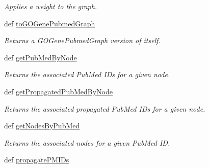 \begin{DoxyCompactItemize}
\begin{DoxyCompactList}\small\item\em Applies a weight to the graph. \end{DoxyCompactList}\item 
def \hyperlink{classgographer_1_1_g_o_pubmed_graph_1_1_g_o_pubmed_graph_a1c154dbc02edbf83254ee5cb5b20fb44}{to\-G\-O\-Gene\-Pubmed\-Graph}
\begin{DoxyCompactList}\small\item\em Returns a G\-O\-Gene\-Pubmed\-Graph version of itself. \end{DoxyCompactList}\item 
def \hyperlink{classgographer_1_1_g_o_pubmed_graph_1_1_g_o_pubmed_graph_a29482c641bfcdf4c98a6d9040f4f5f48}{get\-Pub\-Med\-By\-Node}
\begin{DoxyCompactList}\small\item\em Returns the associated Pub\-Med I\-Ds for a given node. \end{DoxyCompactList}\item 
def \hyperlink{classgographer_1_1_g_o_pubmed_graph_1_1_g_o_pubmed_graph_a983edce6ae320ee5cf42a6a7dee4695f}{get\-Propagated\-Pub\-Med\-By\-Node}
\begin{DoxyCompactList}\small\item\em Returns the associated propagated Pub\-Med I\-Ds for a given node. \end{DoxyCompactList}\item 
def \hyperlink{classgographer_1_1_g_o_pubmed_graph_1_1_g_o_pubmed_graph_a13c9486adf5d33fb73d52f4ed6eb847d}{get\-Nodes\-By\-Pub\-Med}
\begin{DoxyCompactList}\small\item\em Returns the associated nodes for a given Pub\-Med I\-D. \end{DoxyCompactList}\item 
\hypertarget{classgographer_1_1_g_o_pubmed_graph_1_1_g_o_pubmed_graph_affafb8539de441b7a6657923a5d5ba2a}{def \hyperlink{classgographer_1_1_g_o_pubmed_graph_1_1_g_o_pubmed_graph_affafb8539de441b7a6657923a5d5ba2a}{propagate\-P\-M\-I\-Ds}}\label{classgographer_1_1_g_o_pubmed_graph_1_1_g_o_pubmed_graph_affafb8539de441b7a6657923a5d5ba2a}


\end{DoxyCompactItemize}
